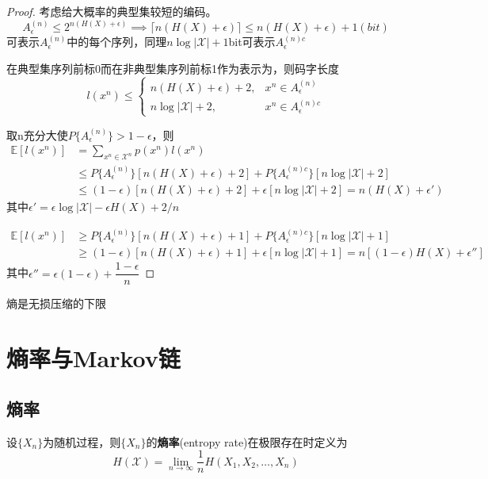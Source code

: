 \documentclass{ctexbook}
\begin{document}
\begin{proof}
    考虑给大概率的典型集较短的编码。
    \[A_{\epsilon}^{(n)}\leq 2^{n(H(X)+\epsilon)}\implies \lceil n(H(X)+\epsilon) \rceil\leq n(H(X)+\epsilon)+1(bit)\]
    可表示$A_{\epsilon}^{(n)}$中的每个序列，同理$n\log|\mathcal{X} |+1$bit可表示$A_{\epsilon}^{(n)c}$

    在典型集序列前标0而在非典型集序列前标1作为表示为，则码字长度
    \[l(x^n)\leq\begin{cases}
        n(H(X)+\epsilon)+2, & x^n\in A_{\epsilon}^{(n)} \\
        n\log |\mathcal{X}| + 2, & x^n\in A_{\epsilon}^{(n)c}
    \end{cases}\]
    
    取n充分大使$P\{A_{\epsilon}^{(n)}\} > 1-\epsilon$，则
    \begin{align*}
        \mathbb{E} [l(x^n)]&=\sum_{x^n\in \mathcal{X} ^n} p(x^n) l(x^n)\\
        &\leq P\{A_{\epsilon}^{(n)}\} [n(H(X)+\epsilon)+2] + P\{A_{\epsilon}^{(n)c}\} [n\log |\mathcal{X}| + 2] \\
        &\leq (1-\epsilon) [n(H(X)+\epsilon)+2] + \epsilon [n\log |\mathcal{X}| + 2]=n(H(X)+\epsilon') 
    \end{align*}
    其中$\epsilon' = \epsilon \log |\mathcal{X}| - \epsilon H(X) + 2/n$

    \begin{align*}
        \mathbb{E} [l(x^n)]&\geq P\{A_{\epsilon}^{(n)}\} [n(H(X)+\epsilon)+1]+P\{A_{\epsilon}^{(n)c}\} [n\log |\mathcal{X}| + 1] \\
        &\geq (1-\epsilon) [n(H(X)+\epsilon)+1]+ \epsilon [n\log |\mathcal{X}| + 1] = n[(1-\epsilon)H(X)+\epsilon'']
    \end{align*}
    其中$\epsilon'' =\epsilon(1-\epsilon)+\dfrac{1-\epsilon}{n}$
\end{proof}
\begin{remark}
    熵是无损压缩的下限
\end{remark}

\chapter{熵率与Markov链}

\section{熵率}

\begin{definition}[熵率]
    设$\{X_n\}$为随机过程，则$\{X_n\}$的\textbf{熵率}(entropy rate)在极限存在时定义为
    \[H(\mathcal{X} ) = \lim_{n\to \infty} \frac{1}{n} H(X_1,X_2,\ldots,X_n)\]
\end{definition}
\end{document}
